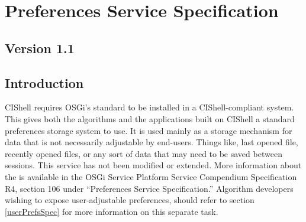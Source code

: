 %

\chapter{Preferences Service Specification}
\label{preferencesService}
\section*{Version 1.1}
\section{Introduction}

CIShell requires OSGi's standard  to be installed in a
CIShell-compliant system. This gives both the algorithms and the applications
built on CIShell a standard preferences storage system to use. It is used mainly
as a storage mechanism for data that is not necessarily adjustable by end-users.
Things like, last opened file, recently opened files, or any sort of data that
may need to be saved between sessions. This service has not been modified or
extended. More information about the  is available in
the OSGi Service Platform Service Compendium Specification R4, section 106 under
``Preferences Service Specification.'' Algorithm developers wishing to expose
user-adjustable preferences, should refer to section \ref{userPrefsSpec} for
more information on this separate task.

